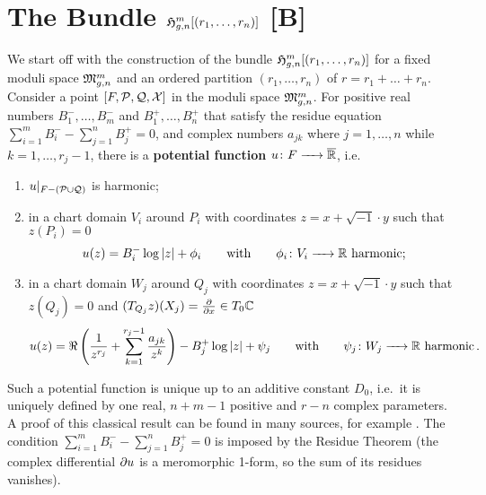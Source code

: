 \section{The Bundle \texorpdfstring{$\Harmr$}{Hmgn[r]} [B]}
\label{cellular_models:from_moduli_spaces_to_parallel_slit_domains}
\label{page:potential_function_parallel}%

We start off with the construction of the bundle $\Harmr$ for a fixed moduli space $\Modspc$ and an ordered partition $(r_1, \ldots, r_n)$ of $r = r_1 + \ldots + r_n$.
Consider a point $[F, \mc P, \mc Q, \mc X]$ in the moduli space $\Modspc$.
For positive real numbers $B_1^-, \ldots, B_m^-$ and $B_1^+, \ldots, B_n^+$ that satisfy the residue equation $\sum_{i=1}^{m} B_i^- - \sum_{j=1}^n B_j^+ = 0$,
and complex numbers $a_{jk}$ where $j = 1, \ldots, n$ while $k = 1, \ldots, r_j-1$, there is a {\bf potential function} $u \colon F \to \ov{\mathbb R}$, i.e.\ 
\begin{enumerate}
    \item $u|_{F - (\mc P \cup \mc Q)}$ is harmonic;
    \item in a chart domain $V_i$ around $P_i$ with coordinates $z = x + \sqrt{-1}\cdot y$ such that $z(P_i) = 0$
        \[
            u(z) = B_i^- \log|z| + \phi_i \mspc{with}{20} \phi_i \colon V_i \to \mathbb R \text{ harmonic};
        \]
    \item in a chart domain $W_j$ around $Q_j$ with coordinates $z = x + \sqrt{-1}\cdot y$ such that $z(Q_j) = 0$ and $(T_{Q_j}z) (X_j) = \frac{\del}{\del x} \in T_0\mathbb C$
        \[
            u(z) = \Re \left( \frac{1}{z^{r_j}} + \sum_{k=1}^{r_j-1} \frac{a_{jk}}{z^k} \right) - B_j^+ \log|z| + \psi_j \mspc{with}{20} \psi_j \colon W_j \to \mathbb R \text{ harmonic} \,.
        \]
\end{enumerate}
Such a potential function is unique up to an additive constant $D_0$, i.e.\
it is uniquely defined by one real, $n+m-1$ positive and $r-n$ complex parameters.
A proof of this classical result can be found in many sources, for example \cite{Koch199105}.
The condition $\sum_{i=1}^{m} B_i^- - \sum_{j=1}^n B_j^+ = 0$ is imposed by the Residue Theorem
(the complex differential $\del u$ is a meromorphic 1-form, so the sum of its residues vanishes).


